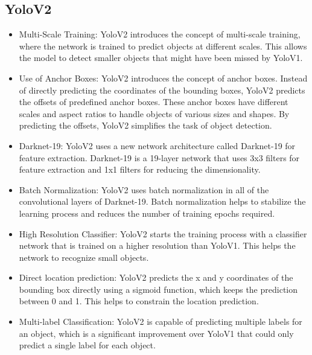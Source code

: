 \subsection{YoloV2}
\begin{itemize}
  \item Multi-Scale Training: YoloV2 introduces the concept of multi-scale training, where the network is trained to predict objects at different scales. This allows the model to detect smaller objects that might have been missed by YoloV1.
  \item Use of Anchor Boxes: YoloV2 introduces the concept of anchor boxes. Instead of directly predicting the coordinates of the bounding boxes, YoloV2 predicts the offsets of predefined anchor boxes. These anchor boxes have different scales and aspect ratios to handle objects of various sizes and shapes. By predicting the offsets, YoloV2 simplifies the task of object detection.
  \item Darknet-19: YoloV2 uses a new network architecture called Darknet-19 for feature extraction. Darknet-19 is a 19-layer network that uses 3x3 filters for feature extraction and 1x1 filters for reducing the dimensionality.
  \item Batch Normalization: YoloV2 uses batch normalization in all of the convolutional layers of Darknet-19. Batch normalization helps to stabilize the learning process and reduces the number of training epochs required.
  \item High Resolution Classifier: YoloV2 starts the training process with a classifier network that is trained on a higher resolution than YoloV1. This helps the network to recognize small objects.
  \item Direct location prediction: YoloV2 predicts the x and y coordinates of the bounding box directly using a sigmoid function, which keeps the prediction between 0 and 1. This helps to constrain the location prediction.
  \item Multi-label Classification: YoloV2 is capable of predicting multiple labels for an object, which is a significant improvement over YoloV1 that could only predict a single label for each object.
\end{itemize}

